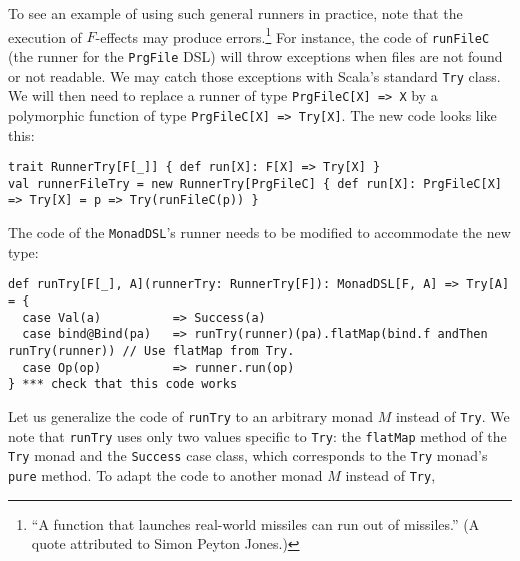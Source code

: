 To see an example of using such general runners in practice, note
that the execution of $F$-effects may produce errors.\footnote{\textsf{``}A function that launches real-world missiles can
run out of missiles.\textsf{''} (A quote attributed to Simon
Peyton Jones.)} For instance, the code of \lstinline!runFileC!
(the runner for the \lstinline!PrgFile!
DSL) will throw exceptions when files are not found or not readable.
We may catch those exceptions with Scala\textsf{'}s standard \lstinline!Try!
class. We will then need to replace a runner of type \lstinline!PrgFileC[X] => X!
by a polymorphic function of type \lstinline!PrgFileC[X] => Try[X]!.
The new code looks like this:
\begin{lstlisting}
trait RunnerTry[F[_]] { def run[X]: F[X] => Try[X] }
val runnerFileTry = new RunnerTry[PrgFileC] { def run[X]: PrgFileC[X] => Try[X] = p => Try(runFileC(p)) }
\end{lstlisting}
 The code of the \lstinline!MonadDSL!\textsf{'}s
runner needs to be modified to accommodate the new type:
\begin{lstlisting}
def runTry[F[_], A](runnerTry: RunnerTry[F]): MonadDSL[F, A] => Try[A] = {
  case Val(a)          => Success(a)
  case bind@Bind(pa)   => runTry(runner)(pa).flatMap(bind.f andThen runTry(runner)) // Use flatMap from Try.
  case Op(op)          => runner.run(op)
} *** check that this code works
\end{lstlisting}
Let us generalize the code of \lstinline!runTry!
to an arbitrary monad $M$ instead of \lstinline!Try!.
We note that \lstinline!runTry!
uses only two values specific to \lstinline!Try!:
the \lstinline!flatMap!
method of the \lstinline!Try!
monad and the \lstinline!Success!
case class, which corresponds to the \lstinline!Try!
monad\textsf{'}s \lstinline!pure!
method. To adapt the code to another monad $M$ instead of \lstinline!Try!,
